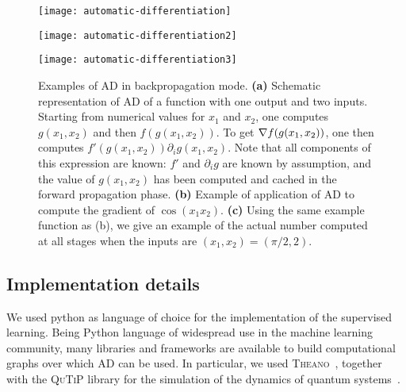 \begin{figure}[tb]
	\centering
	\begin{minipage}{0.3\linewidth}
		\centering
		\texttt{[image: automatic-differentiation]}
	\end{minipage}\hfill
	\begin{minipage}{0.3\linewidth}
		\centering
		\texttt{[image: automatic-differentiation2]}
	\end{minipage}\hfill
	\begin{minipage}{0.3\linewidth}
		\centering
		\texttt{[image: automatic-differentiation3]}
	\end{minipage}
	\caption{
		Examples of \ac{AD} in backpropagation mode.
		\textbf{(a)}
		Schematic representation of \ac{AD} of a function with one output and two inputs.
		Starting from numerical values for $x_1$ and $x_2$, one computes $g(x_1, x_2)$ and then $f(g(x_1, x_2))$.
		To get $\nabla f(g(x_1, x_2))$, one then computes $f'(g(x_1, x_2))\partial_i g(x_1, x_2)$.
		Note that all components of this expression are known: $f'$ and $\partial_i g$ are known by assumption, and the value of $g(x_1, x_2)$ has been computed and cached in the forward propagation phase.
		\textbf{(b)} Example of application of \ac{AD} to compute the gradient of $\cos(x_1 x_2)$.
		\textbf{(c)} Using the same example function as (b), we give an example of the actual number computed at all stages when the inputs are $(x_1, x_2) = (\pi / 2, 2)$.
	}
	\label{fig:automatic-differentiation}
\end{figure}

\subsection{Implementation details}
\label{subsec:GL:implementation_details}

We used python as language of choice for the implementation of the supervised learning.
Being Python language of widespread use in the machine learning community, many libraries and frameworks are available to build computational graphs over which \ac{AD} can be used.
In particular, we used \textsc{Theano}~\cite{team2016theano}, together with the \textsc{QuTiP} library for the simulation of the dynamics of quantum systems~\cite{johansson2012qutip,johansson2013qutip}.

